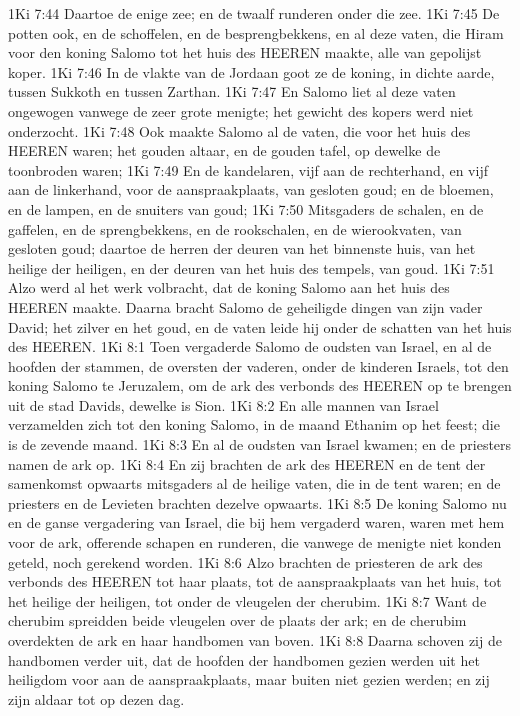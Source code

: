 1Ki 7:44  Daartoe de enige zee; en de twaalf runderen onder die zee.
1Ki 7:45  De potten ook, en de schoffelen, en de besprengbekkens, en al deze vaten, die Hiram voor den koning Salomo tot het huis des HEEREN maakte, alle van gepolijst koper.
1Ki 7:46  In de vlakte van de Jordaan goot ze de koning, in dichte aarde, tussen Sukkoth en tussen Zarthan.
1Ki 7:47  En Salomo liet al deze vaten ongewogen vanwege de zeer grote menigte; het gewicht des kopers werd niet onderzocht.
1Ki 7:48  Ook maakte Salomo al de vaten, die voor het huis des HEEREN waren; het gouden altaar, en de gouden tafel, op dewelke de toonbroden waren;
1Ki 7:49  En de kandelaren, vijf aan de rechterhand, en vijf aan de linkerhand, voor de aanspraakplaats, van gesloten goud; en de bloemen, en de lampen, en de snuiters van goud;
1Ki 7:50  Mitsgaders de schalen, en de gaffelen, en de sprengbekkens, en de rookschalen, en de wierookvaten, van gesloten goud; daartoe de herren der deuren van het binnenste huis, van het heilige der heiligen, en der deuren van het huis des tempels, van goud.
1Ki 7:51  Alzo werd al het werk volbracht, dat de koning Salomo aan het huis des HEEREN maakte. Daarna bracht Salomo de geheiligde dingen van zijn vader David; het zilver en het goud, en de vaten leide hij onder de schatten van het huis des HEEREN.
1Ki 8:1  Toen vergaderde Salomo de oudsten van Israel, en al de hoofden der stammen, de oversten der vaderen, onder de kinderen Israels, tot den koning Salomo te Jeruzalem, om de ark des verbonds des HEEREN op te brengen uit de stad Davids, dewelke is Sion.
1Ki 8:2  En alle mannen van Israel verzamelden zich tot den koning Salomo, in de maand Ethanim op het feest; die is de zevende maand.
1Ki 8:3  En al de oudsten van Israel kwamen; en de priesters namen de ark op.
1Ki 8:4  En zij brachten de ark des HEEREN en de tent der samenkomst opwaarts mitsgaders al de heilige vaten, die in de tent waren; en de priesters en de Levieten brachten dezelve opwaarts.
1Ki 8:5  De koning Salomo nu en de ganse vergadering van Israel, die bij hem vergaderd waren, waren met hem voor de ark, offerende schapen en runderen, die vanwege de menigte niet konden geteld, noch gerekend worden.
1Ki 8:6  Alzo brachten de priesteren de ark des verbonds des HEEREN tot haar plaats, tot de aanspraakplaats van het huis, tot het heilige der heiligen, tot onder de vleugelen der cherubim.
1Ki 8:7  Want de cherubim spreidden beide vleugelen over de plaats der ark; en de cherubim overdekten de ark en haar handbomen van boven.
1Ki 8:8  Daarna schoven zij de handbomen verder uit, dat de hoofden der handbomen gezien werden uit het heiligdom voor aan de aanspraakplaats, maar buiten niet gezien werden; en zij zijn aldaar tot op dezen dag.
